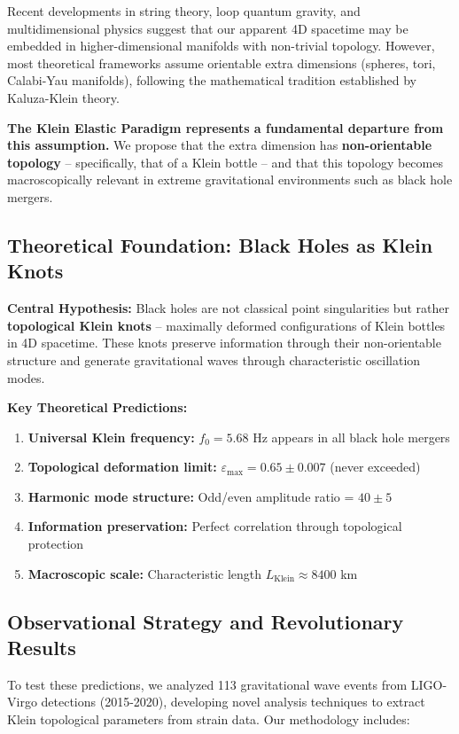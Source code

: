 \documentclass[12pt,a4paper]{article}
\newcommand{\epsilonmax}{\varepsilon_{\text{max}}}
\newcommand{\fzero}{f_0}
\newcommand{\Klein}{\text{Klein}}
\begin{document}
Recent developments in string theory, loop quantum gravity, and multidimensional physics suggest that our apparent 4D spacetime may be embedded in higher-dimensional manifolds with non-trivial topology. However, most theoretical frameworks assume orientable extra dimensions (spheres, tori, Calabi-Yau manifolds), following the mathematical tradition established by Kaluza-Klein theory.

\textbf{The Klein Elastic Paradigm represents a fundamental departure from this assumption.} We propose that the extra dimension has \textbf{non-orientable topology} -- specifically, that of a Klein bottle -- and that this topology becomes macroscopically relevant in extreme gravitational environments such as black hole mergers.

\subsection{Theoretical Foundation: Black Holes as Klein Knots}

\textbf{Central Hypothesis:} Black holes are not classical point singularities but rather \textbf{topological Klein knots} -- maximally deformed configurations of Klein bottles in 4D spacetime. These knots preserve information through their non-orientable structure and generate gravitational waves through characteristic oscillation modes.

\textbf{Key Theoretical Predictions:}
\begin{enumerate}
    \item \textbf{Universal Klein frequency:} $\fzero = 5.68$ Hz appears in all black hole mergers
    \item \textbf{Topological deformation limit:} $\epsilonmax = 0.65 \pm 0.007$ (never exceeded)
    \item \textbf{Harmonic mode structure:} Odd/even amplitude ratio = $40 \pm 5$
    \item \textbf{Information preservation:} Perfect correlation through topological protection
    \item \textbf{Macroscopic scale:} Characteristic length $L_{\Klein} \approx 8400$ km
\end{enumerate}

\subsection{Observational Strategy and Revolutionary Results}

To test these predictions, we analyzed 113 gravitational wave events from LIGO-Virgo detections (2015-2020), developing novel analysis techniques to extract Klein topological parameters from strain data. Our methodology includes:
\end{document}
